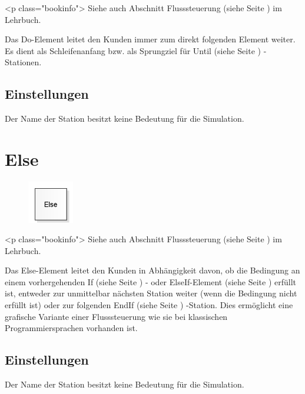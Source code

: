 <p class="bookinfo">
Siehe auch Abschnitt Flusssteuerung (siehe Seite \pageref{ref:book:8.10}) im Lehrbuch.

Das Do-Element leitet den Kunden immer zum direkt folgenden Element weiter.
Es dient als Schleifenanfang bzw. als Sprungziel für
Until (siehe Seite \pageref{ref:ModelElementLogicUntil}) -Stationen.

\subsection*{Einstellungen}

Der Name der Station besitzt keine Bedeutung für die Simulation.


\section{Else}
\label{ref:ModelElementLogicElse}

\begin{figure}
\vspace{-22pt}
\includegraphics[width=2cm]{imageModelElementLogicElse.png}
\vspace{-22pt}
\end{figure}

<p class="bookinfo">
Siehe auch Abschnitt Flusssteuerung (siehe Seite \pageref{ref:book:8.10}) im Lehrbuch.

Das Else-Element leitet den Kunden in Abhängigkeit davon, ob die Bedingung an einem
vorhergehenden If (siehe Seite \pageref{ref:ModelElementLogicIf}) - oder
ElseIf-Element (siehe Seite \pageref{ref:ModelElementLogicElseIf}) erfüllt ist, entweder
zur unmittelbar nächsten Station weiter (wenn die Bedingung nicht erfüllt ist) oder
zur folgenden EndIf (siehe Seite \pageref{ref:ModelElementLogicEndIf}) -Station.
Dies ermöglicht eine grafische Variante einer Flusssteuerung wie sie bei
klassischen Programmiersprachen vorhanden ist.

\subsection*{Einstellungen}

Der Name der Station besitzt keine Bedeutung für die Simulation.


